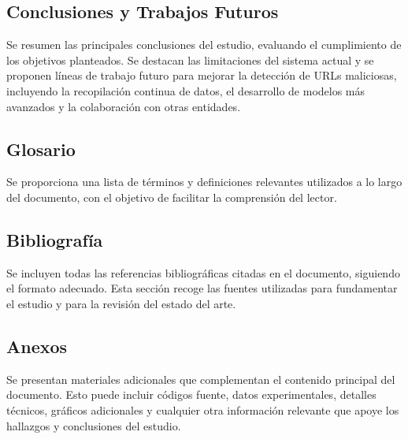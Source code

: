 \subsection*{Conclusiones y Trabajos Futuros}
Se resumen las principales conclusiones del estudio, evaluando el cumplimiento de los objetivos planteados. Se destacan las limitaciones del sistema actual y se proponen líneas de trabajo futuro para mejorar la detección de URLs maliciosas, incluyendo la recopilación continua de datos, el desarrollo de modelos más avanzados y la colaboración con otras entidades.

\subsection*{Glosario}
Se proporciona una lista de términos y definiciones relevantes utilizados a lo largo del documento, con el objetivo de facilitar la comprensión del lector.

\subsection*{Bibliografía}
Se incluyen todas las referencias bibliográficas citadas en el documento, siguiendo el formato adecuado. Esta sección recoge las fuentes utilizadas para fundamentar el estudio y para la revisión del estado del arte.

\subsection*{Anexos}
Se presentan materiales adicionales que complementan el contenido principal del documento. Esto puede incluir códigos fuente, datos experimentales, detalles técnicos, gráficos adicionales y cualquier otra información relevante que apoye los hallazgos y conclusiones del estudio.